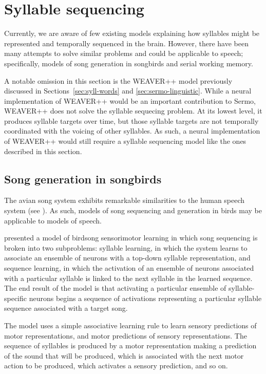 \section{Syllable sequencing}
\label{sec:prev-sequencing}

Currently,
we are aware of few existing models
explaining how syllables
might be represented
and temporally sequenced in the brain.
However, there have been many attempts
to solve similar problems
and could be applicable to speech;
specifically,
models of song generation in songbirds
and serial working memory.

A notable omission in this section
is the WEAVER++ model
previously discussed in
Sections~\ref{sec:syll-words}
and \ref{sec:sermo-linguistic}.
While a neural implementation of WEAVER++
would be an important contribution to Sermo,
WEAVER++ does not solve
the syllable sequecing problem.
At its lowest level,
it produces syllable targets over time,
but those syllable targets are not temporally
coordinated with the voicing of
other syllables.
As such, a neural implementation
of WEAVER++ would still require
a syllable sequencing model
like the ones described in this section.

\subsection{Song generation in songbirds}

The avian song system
exhibits remarkable similarities
to the human speech system
(see \citealt{bolhuis2010}).
As such, models of song sequencing
and generation in birds
may be applicable to models of speech.

\citet{troyer2000} presented a model
of birdsong sensorimotor learning
in which song sequencing is broken
into two subproblems:
syllable learning,
in which the system learns
to associate an ensemble of neurons
with a top-down syllable representation,
and sequence learning,
in which the activation
of an ensemble of neurons
associated with a particular syllable
is linked to the next syllable
in the learned sequence.
The end result of the model
is that activating a particular
ensemble of syllable-specific neurons
begins a sequence of activations
representing a particular syllable sequence
associated with a target song.

The model uses a
simple associative learning rule
to learn sensory predictions
of motor representations,
and motor predictions
of sensory representations.
The sequence of syllables is produced
by a motor representation
making a prediction of the
sound that will be produced,
which is associated with
the next motor action to be produced,
which activates a sensory prediction,
and so on.

